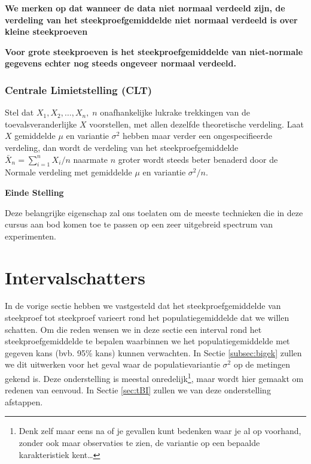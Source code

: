 \documentclass[
  12pt,dutch,coursenotes]{book}
\begin{document}
\textbf{We merken op dat wanneer de data niet normaal verdeeld zijn, de verdeling van het steekproefgemiddelde niet normaal verdeeld is over kleine steekproeven}

\textbf{Voor grote steekproeven is het steekproefgemiddelde van niet-normale gegevens echter nog steeds ongeveer normaal verdeeld.}

\hypertarget{centrale-limietstelling-clt}{%
\subsubsection{Centrale Limietstelling (CLT)}\label{centrale-limietstelling-clt}}

Stel dat \(X_1, X_2, \dots, X_n, \; n\) onafhankelijke lukrake trekkingen van
de toevalsveranderlijke \(X\) voorstellen, met allen dezelfde theoretische
verdeling. Laat \(X\) gemiddelde \(\mu\) en variantie \(\sigma^2\) hebben maar
verder een ongespecifieerde verdeling, dan wordt de verdeling van het
steekproefgemiddelde \(\bar{X}_n = {\sum_{i=1}^{n} X_i}/{n}\) naarmate \(n\)
groter wordt steeds beter benaderd door de Normale verdeling met gemiddelde \(\mu\) en variantie \(\sigma^2/n.\)

\textbf{Einde Stelling}

Deze belangrijke eigenschap zal ons toelaten om de meeste technieken die in deze cursus aan bod komen toe te passen op een zeer uitgebreid spectrum van experimenten.

\hypertarget{intervalschatters}{%
\section{Intervalschatters}\label{intervalschatters}}

In de vorige sectie hebben we vastgesteld dat het steekproefgemiddelde van
steekproef tot steekproef varieert rond het populatiegemiddelde dat we
willen schatten.
Om die reden wensen we in deze sectie een interval rond het
steekproefgemiddelde te bepalen waarbinnen we het populatiegemiddelde met
gegeven kans (bvb. 95\% kans) kunnen verwachten.
In Sectie \ref{subsec:bigek} zullen we dit uitwerken voor het geval waar de populatievariantie \(\sigma^2\)
op de metingen gekend is.
Deze onderstelling is meestal onredelijk\footnote{Denk zelf maar eens na of je gevallen kunt bedenken waar je al op voorhand,
  zonder ook maar observaties te zien, de variantie op een bepaalde
  karakteristiek kent\ldots{}}, maar wordt hier gemaakt om redenen van eenvoud.
In Sectie \ref{sec:tBI} zullen we van deze onderstelling afstappen.
\end{document}
